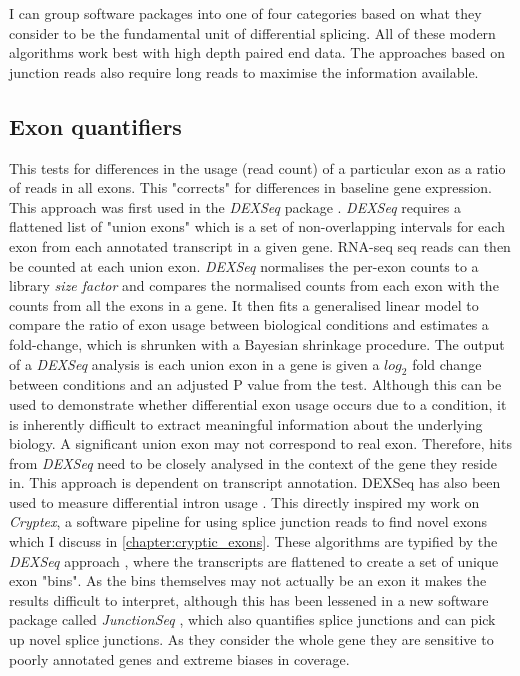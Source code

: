 I can group software packages into one of four categories based on what they consider to be the fundamental unit of differential splicing. 
All of these modern algorithms work best with high depth paired end data. The approaches based on junction reads also require long reads to maximise the information available.

\subsection{Exon quantifiers}
This tests for differences in the usage (read count) of a particular exon as a ratio of reads in all exons. This "corrects" for differences in baseline gene expression.  This approach was first used in the \textit{DEXSeq} package \citep{Anders2012}. 
\textit{DEXSeq} requires a flattened list of "union exons" which is a set of non-overlapping intervals for each exon from each annotated transcript in a given gene. 
RNA-seq seq reads can then be counted at each union exon. 
\textit{DEXSeq} normalises the per-exon counts to a library \textit{size factor} and compares the  normalised counts from each exon with the counts from all the exons in a gene.
It then fits a generalised linear model to compare the ratio of exon usage between biological conditions and estimates a fold-change, which is shrunken with a Bayesian shrinkage procedure.
The output of a \textit{DEXSeq} analysis is each union exon in a gene is given a $log_2$ fold change between conditions and an adjusted P value from the test. 
Although this can be used to demonstrate whether differential exon usage occurs due to a condition, it is inherently difficult to extract meaningful information about the underlying biology. 
A significant union exon may not correspond to real exon. Therefore, hits from \textit{DEXSeq} need to be closely analysed in the context of the gene they reside in. 
This approach is dependent on transcript annotation. 
DEXSeq has also been used to measure differential intron usage \citep{Li2015a}. This directly inspired my work on \textit{Cryptex}, a software pipeline for using splice junction reads to find novel exons which I discuss in \autoref{chapter:cryptic_exons}.
These algorithms are typified by the \textit{DEXSeq} approach \citep{Anders2012}, where the transcripts are flattened to create a set of unique exon "bins".  As the bins themselves may not actually be an exon it makes the results difficult to interpret, although this has been lessened in a new software package called \textit{JunctionSeq} \citep{Hartley2015}, which also quantifies splice junctions and can pick up novel splice junctions. As they consider the whole gene they are sensitive to poorly annotated genes and extreme biases in coverage.

